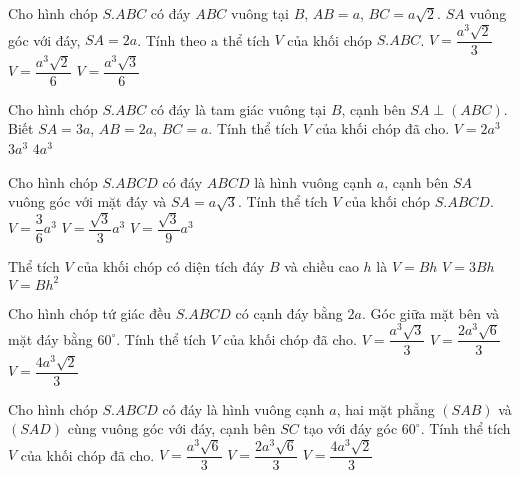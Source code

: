 \begin{ex}%
Cho hình chóp $S.ABC$ có đáy $ABC$ vuông tại $B$, $AB=a$, $BC=a\sqrt{2}$. $SA$ vuông góc với đáy, $SA=2a$. Tính theo a thể tích $V$ của khối chóp $S.ABC$.
{\True $V=\dfrac{a^3\sqrt{2}}{3}$}
{$V=\dfrac{a^3\sqrt{2}}{6}$}
{$V=\dfrac{a^3\sqrt{3}}{6}$}
\end{ex}

\begin{ex}%
Cho hình chóp $S.ABC$ có đáy là tam giác vuông tại $B$, cạnh bên $SA\perp(ABC)$. Biết $SA=3a$, $AB=2a$, $BC=a$. Tính thể tích $V$ của khối chóp đã cho.
{$V=2a^3$}
{$3a^3$}
{$4a^3$}
\end{ex}

\begin{ex}%
Cho hình chóp $S.ABCD$ có đáy $ABCD$ là hình vuông cạnh $a$, cạnh bên $SA$ vuông góc với mặt đáy và $SA=a\sqrt{3}$. Tính thể tích $V$ của khối chóp $S.ABCD$.
{$V=\dfrac{3}{6}a^3$}
{\True $V=\dfrac{\sqrt{3}}{3}a^3$}
{$V=\dfrac{\sqrt{3}}{9}a^3$}
\end{ex}

\begin{ex}%
Thể tích $V$ của khối chóp có diện tích đáy $B$ và chiều cao $h$ là
{$V=Bh$}
{$V=3Bh$}
{$V=Bh^2$}
\end{ex}

\begin{ex}%
Cho hình chóp tứ giác đều $S.ABCD$ có cạnh đáy bằng $2a$. Góc giữa mặt bên và mặt đáy bằng $60^\circ$. Tính thể tích $V$ của khối chóp đã cho.
{$V=\dfrac{a^3\sqrt{3}}{3}$}
{$V=\dfrac{2a^3\sqrt{6}}{3}$}
{$V=\dfrac{4a^3\sqrt{2}}{3}$}
\end{ex}

\begin{ex}%
Cho hình chóp $S.ABCD$ có đáy là hình vuông cạnh $a$, hai mặt phẳng $(SAB)$ và $(SAD)$ cùng vuông góc với đáy, cạnh bên $SC$ tạo với đáy góc $60^\circ$. Tính thể tích $V$ của khối chóp đã cho.
{\True $V=\dfrac{a^3\sqrt{6}}{3}$}
{$V=\dfrac{2a^3\sqrt{6}}{3}$}
{$V=\dfrac{4a^3\sqrt{2}}{3}$}
\end{ex}

